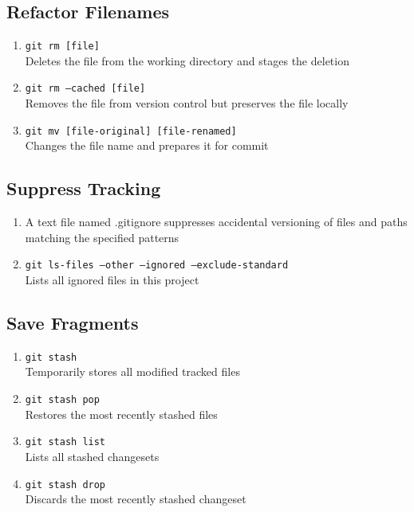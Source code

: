 \documentclass[a4paper, twoside, 11pt]{extarticle}
\newenvironment{enumx} {
    \begin{enumerate}[leftmargin=*]
    \setlength{\topsep}{0pt}
    \setlength{\itemsep}{0pt}
    \setlength{\parskip}{0pt}
    \setlength{\parsep}{0pt}
    }
{\end{enumerate}}
\begin{document}
\begin{multicols}{3}
\subsection{Refactor Filenames}
\begin{enumx}
    \item \texttt{git rm [file]}\\
    Deletes the file from the working directory and stages the deletion
    \item \texttt{git rm --cached [file]}\\
    Removes the file from version control but preserves the file locally
    \item \texttt{git mv [file-original] [file-renamed]}\\
    Changes the file name and prepares it for commit
\end{enumx}

\subsection{Suppress Tracking}
\begin{enumx}
    \item A text file named .gitignore suppresses accidental versioning of files and paths matching the specified patterns
    \item \texttt{git ls-files --other --ignored --exclude-standard}\\
    Lists all ignored files in this project
\end{enumx}

\subsection{Save Fragments}
\begin{enumx}
    \item \texttt{git stash}\\
    Temporarily stores all modified tracked files
    \item \texttt{git stash pop}\\
    Restores the most recently stashed files
    \item \texttt{git stash list}\\
    Lists all stashed changesets
    \item \texttt{git stash drop}\\
    Discards the most recently stashed changeset
\end{enumx}


\end{multicols}
\end{document}

